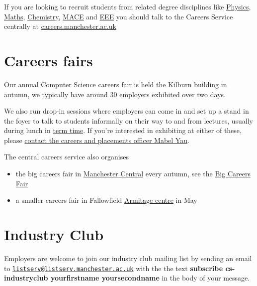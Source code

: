 \documentclass[12pt,]{book}
\begin{document}
If you are looking to recruit students from related degree disciplines like \href{https://www.physics.manchester.ac.uk/}{Physics}, \href{https://www.maths.manchester.ac.uk/}{Maths}, \href{https://www.chemistry.manchester.ac.uk/}{Chemistry}, \href{https://www.mace.manchester.ac.uk/}{MACE} and \href{https://www.eee.manchester.ac.uk/}{EEE} you should talk to the Careers Service centrally at \href{http://www.careers.manchester.ac.uk/}{careers.manchester.ac.uk}

\hypertarget{careers-fairs}{%
\section{Careers fairs}\label{careers-fairs}}

Our annual Computer Science careers fair is held the Kilburn building in autumn, we typically have around 30 employers exhibited over two days.

We also run drop-in sessions where employers can come in and set up a stand in the foyer to talk to students informally on their way to and from lectures, usually during lunch in \href{https://www.manchester.ac.uk/discover/key-dates/}{term time}. If you're interested in exhibiting at either of these, please \protect\hyperlink{contact}{contact the careers and placements officer Mabel Yau}.

The central careers service also organises

\begin{itemize}
\item
  the big careers fair in \href{https://www.manchestercentral.co.uk/}{Manchester Central} every autumn, see the \href{http://www.careers.manchester.ac.uk/events/bigcareersfair/}{Big Careers Fair}
\item
  a smaller careers fair in Fallowfield \href{http://www.sport.manchester.ac.uk/facilities/armitage/}{Armitage centre} in May
\end{itemize}

\hypertarget{industry-club}{%
\section{Industry Club}\label{industry-club}}

Employers are welcome to join our industry club mailing list by sending an email to \href{mailto:listserv@listserv.manchester.ac.uk}{\nolinkurl{listserv@listserv.manchester.ac.uk}} with the the text \textbf{subscribe cs-industryclub yourfirstname yoursecondname} in the body of your message.
\end{document}
